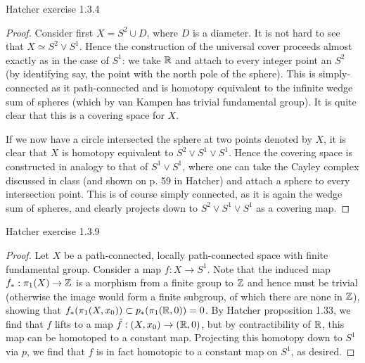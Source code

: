 \documentclass{../../mathnotes}
\begin{document}
\begin{prop}
    Hatcher exercise 1.3.4
\end{prop}
\begin{proof}
    Consider first $X=S^2\cup D$, where $D$ is a diameter. It is not hard to see that $X\simeq S^2\vee S^1$.
    Hence the construction of the universal cover proceeds almost exactly as in the case of $S^1$:
    we take $\mathbb{R}$ and attach to every integer point an $S^2$ (by identifying say, the point with the
    north pole of the sphere). This is simply-connected as it path-connected and is homotopy equivalent
    to the infinite wedge sum of spheres (which by van Kampen has trivial fundamental group). It
    is quite clear that this is a covering space for $X$.

    If we now have a circle intersected the sphere at two points denoted by $X$, it is clear
    that $X$ is homotopy equivalent to $S^2\vee S^1\vee S^1$. Hence the covering space
    is constructed in analogy to that of $S^1\vee S^1$, where one can take the Cayley
    complex discussed in class (and shown on p. 59 in Hatcher) and attach a sphere to every
    intersection point. This is of course simply connected, as it is again the wedge sum of
    spheres, and clearly projects down to $S^2\vee S^1\vee S^1$ as a covering map.
\end{proof}

\begin{prop}
    Hatcher exercise 1.3.9
\end{prop}
\begin{proof}
    Let $X$ be a path-connected, locally path-connected space with finite fundamental
    group. Consider a map $f:X\to S^1$. Note that the induced map $f_*:\pi_1(X)\to\mathbb{Z}$
    is a morphism from a finite group to $\mathbb{Z}$ and hence must be trivial (otherwise
    the image would form a finite subgroup, of which there are none in $\mathbb{Z}$), showing
    that $f_*(\pi_1(X,x_0))\subset p_*(\pi_1(\mathbb{R},0))=0$. By Hatcher proposition 1.33,
    we find that $f$ lifts to a map $\tilde f:(X,x_0)\to(\mathbb{R},0)$, but by contractibility
    of $\mathbb{R}$, this map can be homotoped to a constant map. Projecting this
    homotopy down to $S^1$ via $p$, we find that $f$ is in fact homotopic to 
    a constant map on $S^1$, as desired.
\end{proof}
\end{document}
